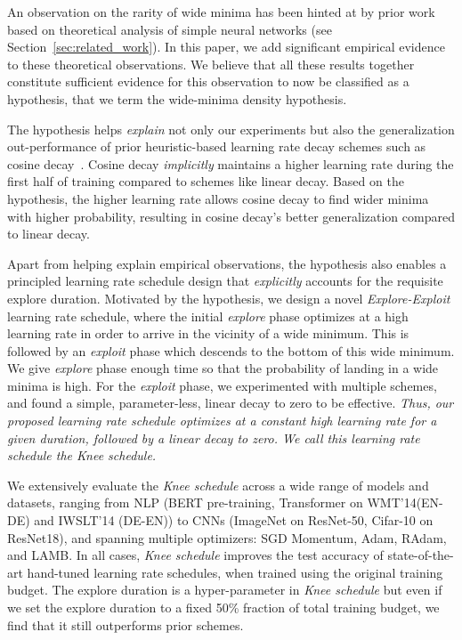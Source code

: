 \documentclass[twoside,11pt]{article}
\newcommand{\lrschedule}{\textit{Knee schedule}}
\begin{document}
An observation on the rarity of wide minima has been hinted at by prior work~\citep{wu2018sgd,baldassi2020shaping} based on theoretical analysis of simple neural networks (see Section~\ref{sec:related_work}). In this paper, we add significant empirical evidence to these theoretical observations. We believe that all these results together constitute sufficient evidence for this observation to now be classified as a hypothesis, that we term the wide-minima density hypothesis.

The hypothesis helps {\it explain} not only our experiments but also the generalization out-performance of prior heuristic-based learning rate decay schemes such as cosine decay~\citep{loshchilov2016sgdr}. Cosine decay {\it implicitly} maintains a higher learning rate during the first half of training compared to schemes like linear decay. Based on the hypothesis, the higher learning rate allows cosine decay to find wider minima with higher probability, resulting in cosine decay's better generalization compared to linear decay.

Apart from helping explain empirical observations, the hypothesis also enables a principled learning rate schedule design that {\it explicitly} accounts for the requisite explore duration. Motivated by the hypothesis, we design a novel {\it Explore-Exploit} learning rate schedule, where the initial \textit{explore} phase optimizes at a high learning rate in order to arrive in the vicinity of a wide minimum. This is followed by an \textit{exploit} phase which descends to the bottom of this wide minimum. We give {\it explore} phase enough time so that the probability of landing in a wide minima is high. For the \textit{exploit} phase, we experimented with multiple schemes, and found a simple, parameter-less, linear decay to zero to be effective. \textit{Thus, our proposed learning rate schedule optimizes at a constant high learning rate for a given duration, followed by a linear decay to zero. We call this learning rate schedule the \lrschedule{}.} 
 



We extensively evaluate the \lrschedule{} across a wide range of models and datasets, ranging from NLP (BERT pre-training, Transformer on WMT'14(EN-DE) and IWSLT'14 (DE-EN)) to CNNs (ImageNet on ResNet-50, Cifar-10 on ResNet18), and spanning multiple optimizers: SGD Momentum, Adam, RAdam,  and LAMB.  In all cases, \lrschedule{} improves the test accuracy of state-of-the-art hand-tuned learning rate schedules, when trained using the original training budget. The explore duration is a hyper-parameter in \lrschedule{} but even if we set the explore duration to a fixed 50\% fraction of total training budget, we find that it still outperforms prior schemes.
\end{document}
